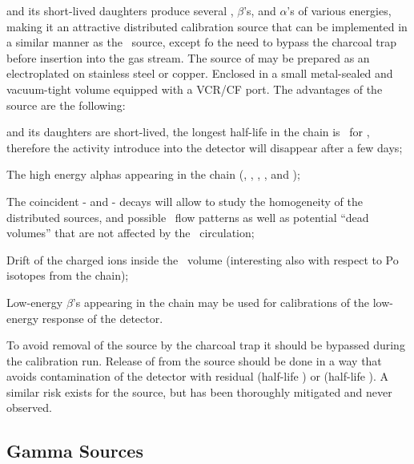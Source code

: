  and its short-lived daughters produce several \grs, $\beta$'s, and $\alpha$'s of various energies, making it an attractive distributed calibration source that can be implemented in a similar manner as the \Kr\ source, except fo the need to bypass the charcoal trap before insertion into the gas stream.  The source of  may be prepared as an electroplated  on stainless steel or copper.  Enclosed in a small metal-sealed and vacuum-tight volume equipped with a VCR/CF port.  The advantages of the  source are the following:

\begin{compactitem}
\item {} and its daughters are short-lived, the longest half-life in the chain is \BiTwoOneTwoHalfLife\ for , therefore the activity introduce into the detector will disappear after a few days;
\item The high energy alphas appearing in the chain (\BiTwoOneTwoAlphaTwoEnergy, \BiTwoOneTwoAlphaOneEnergy, \RnTwoTwoZeroAlphaEnergy, \PoTwoOneSixAlphaEnergy, and \PoTwoOneTwoAlphaEnergy);
\item The coincident - and - decays will allow to study the homogeneity of the distributed sources, and possible \LAr\ flow patterns as well as potential ``dead volumes'' that are not affected by the \LAr\ circulation;
\item Drift of the charged ions inside the \LAr\ volume (interesting also with respect to Po isotopes from the  chain);
\item Low-energy $\beta$'s appearing in the chain may be used for calibrations of the low-energy response of the detector.
\end{compactitem}

To avoid removal of the  source by the charcoal trap it should be bypassed during the calibration run.  Release of  from the source should be done in a way that avoids contamination of the detector with residual  (half-life \RaTwoTwoFourHalfLife) or  (half-life \ThTwoTwoEightHalfLife).  A similar risk exists for the  source, but has been thoroughly mitigated and never observed.


\subsection{Gamma Sources}

